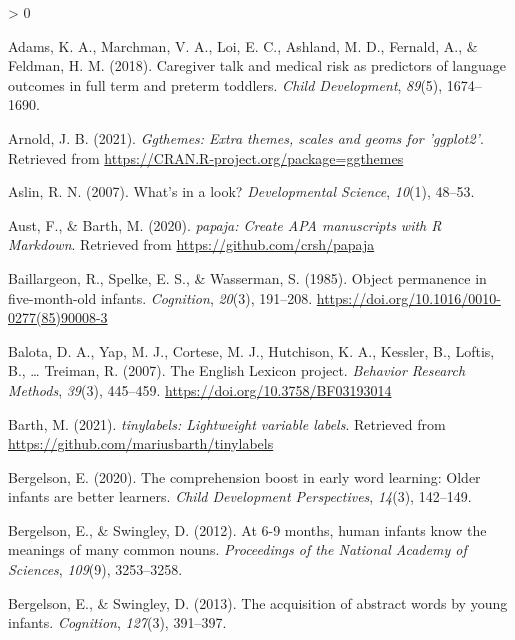 \documentclass[
  english,
  man,floatsintext]{apa6}
\newlength{\cslhangindent}
\newenvironment{CSLReferences}[2] %
 {%
  \setlength{\parindent}{0pt}
  \ifodd #1 \everypar{\setlength{\hangindent}{\cslhangindent}}\ignorespaces\fi
  \ifnum #2 > 0
  \setlength{\parskip}{#2\baselineskip}
  \fi
 }%
 {}
\begin{document}
\hypertarget{refs}{}
\begin{CSLReferences}{1}{0}
\leavevmode\hypertarget{ref-Adams2018}{}%
Adams, K. A., Marchman, V. A., Loi, E. C., Ashland, M. D., Fernald, A., \& Feldman, H. M. (2018). {Caregiver talk and medical risk as predictors of language outcomes in full term and preterm toddlers}. \emph{Child Development}, \emph{89}(5), 1674--1690.

\leavevmode\hypertarget{ref-R-ggthemes}{}%
Arnold, J. B. (2021). \emph{Ggthemes: Extra themes, scales and geoms for 'ggplot2'}. Retrieved from \url{https://CRAN.R-project.org/package=ggthemes}

\leavevmode\hypertarget{ref-Aslin2007}{}%
Aslin, R. N. (2007). {What's in a look?} \emph{Developmental Science}, \emph{10}(1), 48--53.

\leavevmode\hypertarget{ref-R-papaja}{}%
Aust, F., \& Barth, M. (2020). \emph{{papaja}: {Create} {APA} manuscripts with {R Markdown}}. Retrieved from \url{https://github.com/crsh/papaja}

\leavevmode\hypertarget{ref-Baillargeon1985}{}%
Baillargeon, R., Spelke, E. S., \& Wasserman, S. (1985). {Object permanence in five-month-old infants}. \emph{Cognition}, \emph{20}(3), 191--208. \url{https://doi.org/10.1016/0010-0277(85)90008-3}

\leavevmode\hypertarget{ref-Balota2007}{}%
Balota, D. A., Yap, M. J., Cortese, M. J., Hutchison, K. A., Kessler, B., Loftis, B., \ldots{} Treiman, R. (2007). {The English Lexicon project}. \emph{Behavior Research Methods}, \emph{39}(3), 445--459. \url{https://doi.org/10.3758/BF03193014}

\leavevmode\hypertarget{ref-R-tinylabels}{}%
Barth, M. (2021). \emph{{tinylabels}: Lightweight variable labels}. Retrieved from \url{https://github.com/mariusbarth/tinylabels}

\leavevmode\hypertarget{ref-bergelson2020}{}%
Bergelson, E. (2020). The comprehension boost in early word learning: Older infants are better learners. \emph{Child Development Perspectives}, \emph{14}(3), 142--149.

\leavevmode\hypertarget{ref-bergelson2012}{}%
Bergelson, E., \& Swingley, D. (2012). {At 6-9 months, human infants know the meanings of many common nouns.} \emph{Proceedings of the National Academy of Sciences}, \emph{109}(9), 3253--3258.

\leavevmode\hypertarget{ref-bergelson2013}{}%
Bergelson, E., \& Swingley, D. (2013). {{T}he acquisition of abstract words by young infants}. \emph{Cognition}, \emph{127}(3), 391--397.


\end{CSLReferences}
\end{document}
